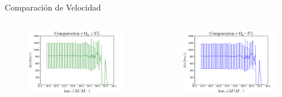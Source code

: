 \documentclass{beamer}
\begin{document}
\begin{frame}{Comparación de Velocidad}
	\begin{columns}
		\begin{column}{0.5\textwidth}
			\begin{figure}[!h]
			\begin{center}
				\includegraphics[width=\textwidth]{im/logm-deltav-mas}
				\label{fig:v1}
			\end{center}
		\end{figure}
		\end{column}
		
		\begin{column}{0.5\textwidth}
			\begin{figure}[!h]
			\begin{center}
				\includegraphics[width=\textwidth]{im/logm-deltav-menos}
				\label{fig:v2}
			\end{center}
		\end{figure}
		\end{column}
	\end{columns}
\end{frame}
\end{document}
